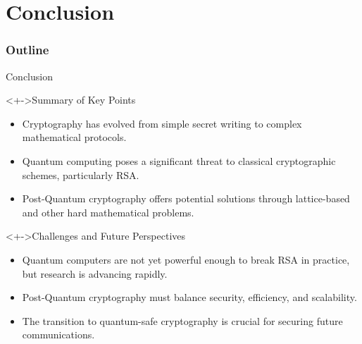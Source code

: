 \documentclass{beamer}
\begin{document}
% 

\section{Conclusion}
\begin{frame}
  \frametitle{Outline}
  \tableofcontents[currentsection]
\end{frame}
\begin{frame}{Conclusion}
\begin{linenumbers}
    \begin{block}<+->{Summary of Key Points}
        \begin{itemize}
            \item Cryptography has evolved from simple secret writing to complex mathematical protocols.
            \item Quantum computing poses a significant threat to classical cryptographic schemes, particularly RSA.
            \item Post-Quantum cryptography offers potential solutions through lattice-based and other hard mathematical problems.
        \end{itemize}
    \end{block}
    
    \begin{block}<+->{Challenges and Future Perspectives}
        \begin{itemize}
            \item Quantum computers are not yet powerful enough to break RSA in practice, but research is advancing rapidly.
            \item Post-Quantum cryptography must balance security, efficiency, and scalability.
            \item The transition to quantum-safe cryptography is crucial for securing future communications.
        \end{itemize}
    \end{block}
    
\end{linenumbers}
\end{frame}
\end{document}
